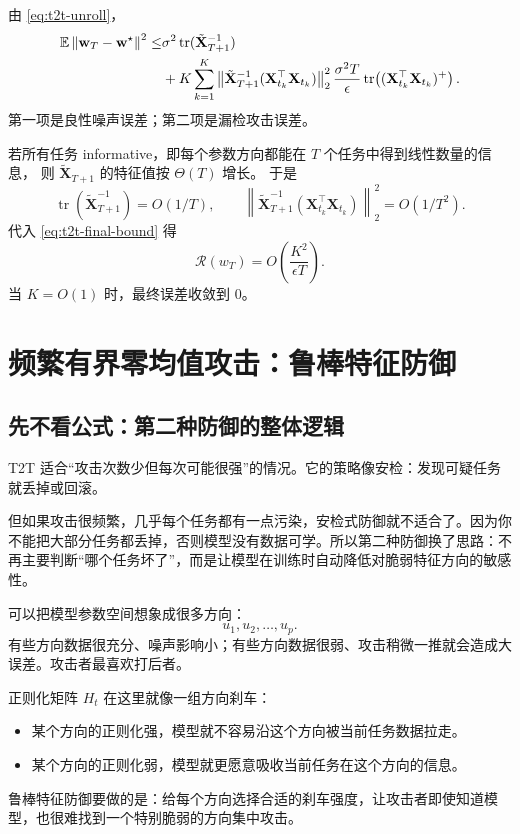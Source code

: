 \documentclass[UTF8,fontset=none,11pt]{ctexart}
\theoremstyle{cnstyle}
\newcommand{\E}{\mathbb{E}}
\newcommand{\tr}{\operatorname{tr}}
\newcommand{\calR}{\mathcal{R}}
\newcommand{\norm}[1]{\left\lVert #1\right\rVert}
\begin{document}
由 \eqref{eq:t2t-unroll}，
\begin{align}
  \E\norm{\mathbf w_T-\mathbf w^\star}^2
  \le&
  \sigma^2\tr(\tilde{\mathbf X}_{T+1}^{-1})
  \notag\\
  &+
  K\sum_{k=1}^K
  \left\|
  \tilde{\mathbf X}_{T+1}^{-1}
  (\mathbf X_{t_k}^\top\mathbf X_{t_k})
  \right\|_2^2
  \frac{\sigma^2T}{\epsilon}
  \tr\!\left((\mathbf X_{t_k}^\top\mathbf X_{t_k})^+\right).
  \label{eq:t2t-final-bound}
\end{align}
第一项是良性噪声误差；第二项是漏检攻击误差。

若所有任务 informative，即每个参数方向都能在 \(T\) 个任务中得到线性数量的信息，
则 \(\tilde{\mathbf X}_{T+1}\) 的特征值按 \(\Theta(T)\) 增长。
于是
\[
  \tr(\tilde{\mathbf X}_{T+1}^{-1})=O(1/T),
  \qquad
  \left\|
  \tilde{\mathbf X}_{T+1}^{-1}
  (\mathbf X_{t_k}^\top\mathbf X_{t_k})
  \right\|_2^2=O(1/T^2).
\]
代入 \eqref{eq:t2t-final-bound} 得
\[
  \calR(w_T)=O\!\left(\frac{K^2}{\epsilon T}\right).
\]
当 \(K=O(1)\) 时，最终误差收敛到 0。

\section{频繁有界零均值攻击：鲁棒特征防御}

\subsection{先不看公式：第二种防御的整体逻辑}

T2T 适合“攻击次数少但每次可能很强”的情况。它的策略像安检：发现可疑任务就丢掉或回滚。

但如果攻击很频繁，几乎每个任务都有一点污染，安检式防御就不适合了。因为你不能把大部分任务都丢掉，否则模型没有数据可学。所以第二种防御换了思路：不再主要判断“哪个任务坏了”，而是让模型在训练时自动降低对脆弱特征方向的敏感性。

可以把模型参数空间想象成很多方向：
\[
  u_1,u_2,\dots,u_p.
\]
有些方向数据很充分、噪声影响小；有些方向数据很弱、攻击稍微一推就会造成大误差。攻击者最喜欢打后者。

正则化矩阵 \(H_t\) 在这里就像一组方向刹车：
\begin{itemize}
  \item 某个方向的正则化强，模型就不容易沿这个方向被当前任务数据拉走。
  \item 某个方向的正则化弱，模型就更愿意吸收当前任务在这个方向的信息。
\end{itemize}
鲁棒特征防御要做的是：给每个方向选择合适的刹车强度，让攻击者即使知道模型，也很难找到一个特别脆弱的方向集中攻击。
\end{document}
